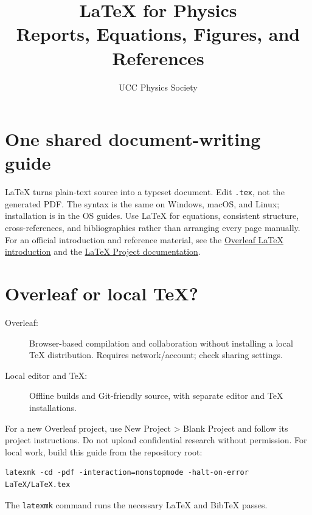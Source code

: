 \documentclass[11pt]{article}
\title{LaTeX for Physics\\Reports, Equations, Figures, and References}
\author{UCC Physics Society}
\begin{document}
\maketitle
\tableofcontents
\newpage

\section{One shared document-writing guide}
LaTeX turns plain-text source into a typeset document. Edit \texttt{.tex},
not the generated PDF. The syntax is the same on Windows, macOS, and Linux;
installation is in the OS guides. Use LaTeX for equations, consistent structure,
cross-references, and bibliographies rather than arranging every page manually.
For an official introduction and reference material, see the
\href{https://www.overleaf.com/learn/latex/Learn_LaTeX_in_30_minutes}{Overleaf
LaTeX introduction} and the
\href{https://www.latex-project.org/help/documentation/}{LaTeX Project
documentation}.

\section{Overleaf or local TeX?}
\begin{description}
\item[Overleaf:] Browser-based compilation and collaboration without installing
a local TeX distribution. Requires network/account; check sharing settings.
\item[Local editor and TeX:] Offline builds and Git-friendly source, with
separate editor and TeX installations.
\end{description}
For a new Overleaf project, use New Project > Blank Project and follow its
project instructions. Do not upload confidential research without permission.
For local work, build this guide from the repository root:
\begin{lstlisting}
latexmk -cd -pdf -interaction=nonstopmode -halt-on-error LaTeX/LaTeX.tex
\end{lstlisting}
The \texttt{latexmk} command runs the necessary LaTeX and BibTeX passes.
\end{document}
